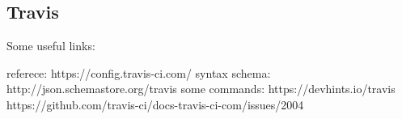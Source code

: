 \documentclass[../LabBook]{subfiles}
\begin{document}
    \subsection{Travis}

    Some useful links:

    referece: https://config.travis-ci.com/
    syntax schema: http://json.schemastore.org/travis
    some commands: https://devhints.io/travis
    https://github.com/travis-ci/docs-travis-ci-com/issues/2004
\end{document}
